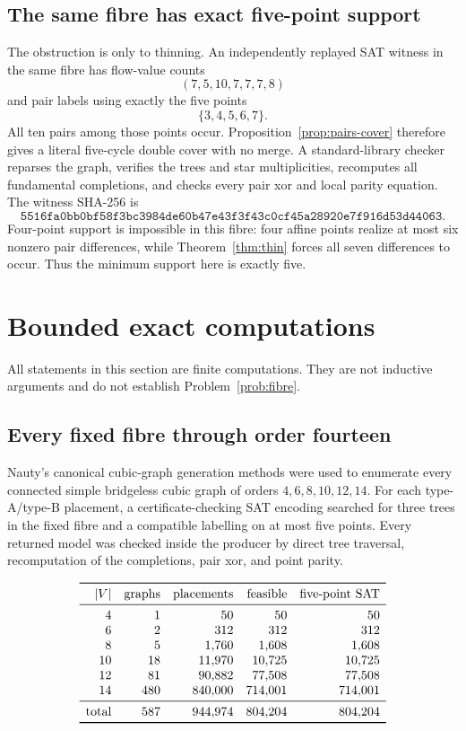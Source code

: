 \documentclass[11pt]{article}
\theoremstyle{definition}
\theoremstyle{remark}
\newcommand{\1}{\mathbf 1}
\begin{document}
\subsection{The same fibre has exact five-point support}

The obstruction is only to thinning.  An independently replayed SAT witness
in the same fibre has flow-value counts
\[
 (7,5,10,7,7,7,8)
\]
and pair labels using exactly the five points
\[
 \{3,4,5,6,7\}.
\]
All ten pairs among those points occur.  Proposition~\ref{prop:pairs-cover}
therefore gives a literal five-cycle double cover with no merge.  A
standard-library checker reparses the graph, verifies the trees and star
multiplicities, recomputes all fundamental completions, and checks every
pair xor and local parity equation.  The witness SHA-256 is
\[
\texttt{5516fa0bb0bf58f3bc3984de60b47e43f3f43c0cf45a28920e7f916d53d44063}.
\]
Four-point support is impossible in this fibre: four affine points realize
at most six nonzero pair differences, while Theorem~\ref{thm:thin} forces
all seven differences to occur.  Thus the minimum support here is exactly
five.

\section{Bounded exact computations}

All statements in this section are finite computations.  They are not
inductive arguments and do not establish Problem~\ref{prob:fibre}.

\subsection{Every fixed fibre through order fourteen}

Nauty's canonical cubic-graph generation methods
\cite{BrinkmannGoedgebeurMcKay2011} were used to enumerate every connected
simple bridgeless cubic graph of orders \(4,6,8,10,12,14\).  For each
type-A/type-B placement, a certificate-checking SAT encoding searched for
three trees in the fixed fibre and a compatible labelling on at most five
points.  Every returned model was checked inside the producer by direct
tree traversal, recomputation of the completions, pair xor, and point
parity.

\[
\begin{array}{rrrrr}
\toprule
|V|&\text{graphs}&\text{placements}&\text{feasible}&
 \text{five-point SAT}\\
\midrule
4&1&50&50&50\\
6&2&312&312&312\\
8&5&1{,}760&1{,}608&1{,}608\\
10&18&11{,}970&10{,}725&10{,}725\\
12&81&90{,}882&77{,}508&77{,}508\\
14&480&840{,}000&714{,}001&714{,}001\\
\midrule
\text{total}&587&944{,}974&804{,}204&804{,}204\\
\bottomrule
\end{array}
\]
\end{document}
